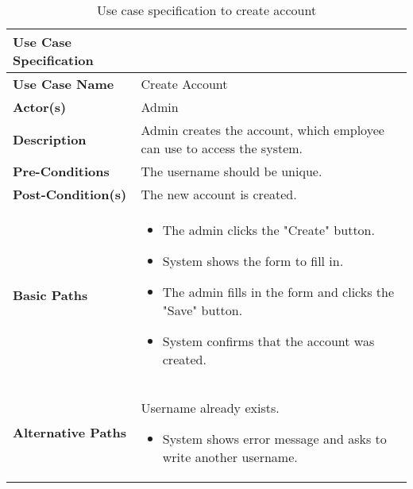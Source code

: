 \documentclass[a4paper]{article}
\begin{document}
      \begin{longtable}{|p{}|p{}|}
        \caption{Use case specification to create account}
        \label{createAccountUseCase} \\
        \hline
        Use Case Specification  &  \\
         \hline
         \endhead
         \textbf{Use Case Name} & Create Account\\
         \hline
         \textbf{Actor(s)} & Admin \\
         \hline
         \textbf{Description} & Admin creates the account, which employee can use to access the system. \\
         \hline
         \textbf{Pre-Conditions} & The username should be unique. \\
         \hline
        \textbf{Post-Condition(s)} & The new account is created.\\
         \hline
         \textbf{Basic Paths} &
         \begin{itemize}
             \item The admin clicks the "Create" button.
             \item System shows the form to fill in.
             \item The admin fills in the form and clicks the "Save" button.
             \item System confirms that the account was created.
         \end{itemize} 
       \\
         
      \hline
    \textbf{Alternative Paths} & Username already exists.
        \begin{itemize}
            \item System shows error message and asks to write another username.
        \end{itemize} \\
        \hline
    \end{longtable}
    
\end{document}
